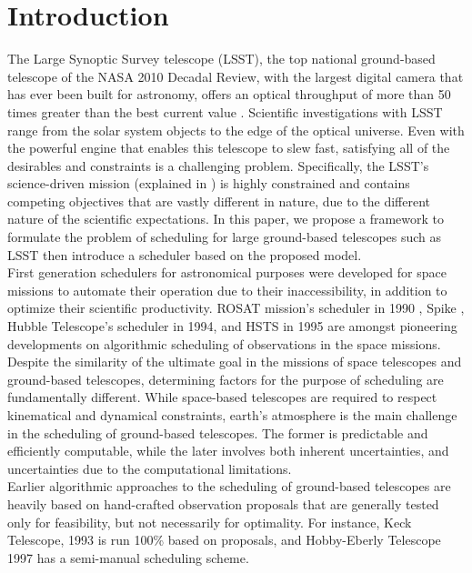 \documentclass[11pt]{article}
\theoremstyle{definition}
\begin{document}
\section{Introduction}
The Large Synoptic Survey telescope (LSST), the top national ground-based telescope of the NASA 2010 Decadal Review, with the largest digital camera that has ever been built for astronomy, offers an optical throughput of more than 50 times greater than the best current value \cite{tyson2002large}. Scientific investigations with LSST range from the solar system objects to the edge of the optical universe. 
Even with the powerful engine that enables this telescope to slew fast, satisfying all of the desirables and constraints is a challenging problem. Specifically, the LSST's science-driven mission (explained in \cite{ivezic2008large}) is highly constrained and contains competing objectives that are vastly different in nature, due to the different nature of the scientific expectations. In this paper, we propose a framework to formulate the problem of scheduling for large ground-based telescopes such as LSST then introduce a scheduler based on the proposed model.\\
First generation schedulers for astronomical purposes were developed for space missions to automate their operation due to their inaccessibility, in addition to optimize their scientific productivity. ROSAT mission's scheduler in 1990 \cite{nowakovski1999using},  Spike \cite{johnston1994spike}, Hubble Telescope's scheduler in 1994, and HSTS \cite{muscettola1995automating} in 1995 are amongst pioneering developments on algorithmic scheduling of observations in the space missions.\\
Despite the similarity of the ultimate goal in the missions of space telescopes and ground-based telescopes, determining factors for the purpose of scheduling are fundamentally different. While space-based telescopes are required to respect kinematical and dynamical constraints, earth's atmosphere is the main challenge in the scheduling of ground-based telescopes. The former is predictable and efficiently computable, while the later involves both inherent uncertainties, and uncertainties due to the computational limitations.\\
Earlier algorithmic approaches to the scheduling of ground-based telescopes are heavily based on hand-crafted observation proposals that are generally tested only for feasibility, but not necessarily for optimality. For instance,  Keck Telescope, 1993 \cite{nelson1985design} is run 100\% based on proposals, and Hobby-Eberly Telescope 1997 \cite{shetrone2007ten} has a semi-manual scheduling scheme.\\
\end{document}
